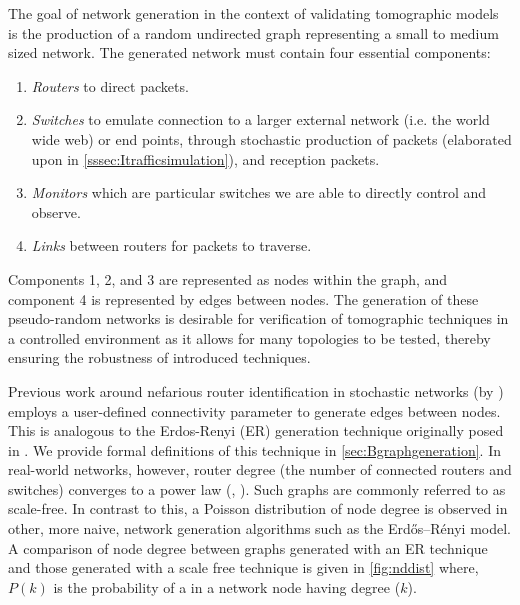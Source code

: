 The goal of network generation in the context of validating tomographic models is the production of a random undirected graph representing a small to medium sized network. The generated network must contain four essential components: 
\begin{enumerate}
    \item \textit{Routers} to direct packets.
    \item \textit{Switches} to emulate connection to a larger external network (i.e. the world wide web) or end points, through stochastic production of packets (elaborated upon in \cref{sssec:Itrafficsimulation}), and reception packets.
    \item \textit{Monitors} which are particular switches we are able to directly control and observe.
    \item \textit{Links} between routers for packets to traverse.
\end{enumerate}
Components 1, 2, and 3 are represented as nodes within the graph, and component 4 is represented by edges between nodes. The generation of these pseudo-random networks is desirable for verification of tomographic techniques in a controlled environment as it allows for many topologies to be tested, thereby ensuring the robustness of introduced techniques.\par
Previous work around nefarious router identification in stochastic networks (by \cite{barnes_stochastic_2020}) employs a user-defined connectivity parameter to generate edges between nodes. This is analogous to the Erdos-Renyi (ER) generation technique originally posed in \cite{erdos_random_1959}. We provide formal definitions of this technique in \cref{sec:Bgraphgeneration}. In real-world networks, however, router degree (the number of connected routers and switches) converges to a power law (\cite{chen_origin_2002}, \cite{zhao_measurement_2020}). Such graphs are commonly referred to as scale-free. In contrast to this, a Poisson distribution of node degree is observed in other, more naive, network generation algorithms such as the Erdős–Rényi model. A comparison of node degree between graphs generated with an ER technique and those generated with a scale free technique is given in \cref{fig:nddist} where, $P(k)$ is the probability of a in a network node having degree ($k$).\par
